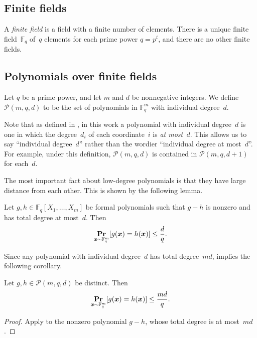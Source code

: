 \documentclass[11pt]{article}
\theoremstyle{definition}
\renewcommand{\Pr}{\mathop{\bf Pr\/}}
\newcommand{\F}{\mathbb F}
\newcommand{\calP}{\mathcal{P}}
\newcommand{\bx}{{\boldsymbol{x}}}
\newcommand{\polyfunc}[3]{\calP(#1, #2, #3)}
\begin{document}
\subsection{Finite fields}

A \emph{finite field} is a field with a finite number of elements.
There is a unique finite field~$\F_q$ of~$q$ elements for each prime power $q = p^t$,
and there are no other finite fields.

\subsection{Polynomials over finite fields}

\begin{definition}
Let $q$ be a prime power,
and let $m$ and $d$ be nonnegative integers.
We define $\polyfunc{m}{q}{d}$ to be the set of polynomials in $\F_q^m$
with individual degree~$d$.
\end{definition}

\begin{remark}
Note that as defined in ,
in this work a polynomial with individual degree~$d$ is one in which the degree~$d_i$ of each coordinate~$i$
is \emph{at most~$d$}.
This allows us to say ``individual degree~$d$'' rather than the wordier ``individual degree at most~$d$''.
For example, under this definition, $\polyfunc{m}{q}{d}$ is contained in $\polyfunc{m}{q}{d+1}$ for each~$d$.
\end{remark}

The most important fact about low-degree polynomials is that they have large distance from each other.
This is shown by the following lemma.

\begin{lemma}\label{lem:schwartz-zippel-total-degree}
Let $g,h\in\F_q[X_1,\ldots,X_m]$ be formal polynomials such that
$g-h$ is nonzero and has total degree at most~$d$.
Then
\begin{equation*}
\Pr_{\bx \sim \F_q^m}[g(\bx) = h(\bx)] \leq \frac{d}{q}.
\end{equation*}
\end{lemma}

Since any polynomial with individual degree~$d$ has total degree~$md$,
 implies the following corollary.

\begin{corollary}
Let $g, h \in \polyfunc{m}{q}{d}$ be distinct. Then
\begin{equation*}
\Pr_{\bx \sim \F_q^m}[g(\bx) = h(\bx)] \leq \frac{md}{q}.
\end{equation*}
\end{corollary}
\begin{proof}
Apply  to the nonzero
polynomial $g-h$, whose total degree is at most~$md$.
\end{proof}
\end{document}
